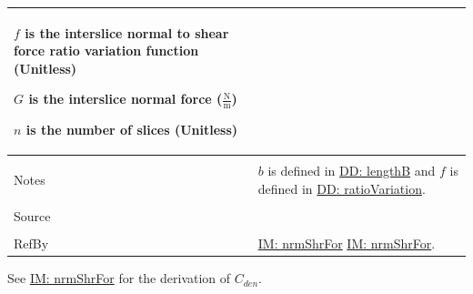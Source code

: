 \documentclass[12pt]{article}
\begin{document}
\begin{minipage}{\textwidth}
\begin{tabular}{p{} p{}}
\begin{symbDescription}
                                                                                           \item{$f$ is the interslice normal to shear force ratio variation function (Unitless)}
                                                                                           \item{$G$ is the interslice normal force ($\frac{\text{N}}{\text{m}}$)}
                                                                                           \item{$n$ is the number of slices (Unitless)}
                                                                                           \end{symbDescription}
                                                                                           \\ \midrule \\
                                                                                           Notes & $b$ is defined in \hyperref[DD:lengthB]{DD: lengthB} and $f$ is defined in \hyperref[DD:ratioVariation]{DD: ratioVariation}.
                                                                                                   \\ \midrule \\
                                                                                                   Source & \cite{chen2005}
                                                                                                            \\ \midrule \\
                                                                                                            RefBy & \hyperref[IM:nrmShrFor]{IM: nrmShrFor} \hyperref[IM:nrmShrFor]{IM: nrmShrFor}.
\\ \bottomrule \end{tabular}
\end{minipage}
See \hyperref[IM:nrmShrFor]{IM: nrmShrFor} for the derivation of ${C_{den}}$.
\par~
\end{document}
